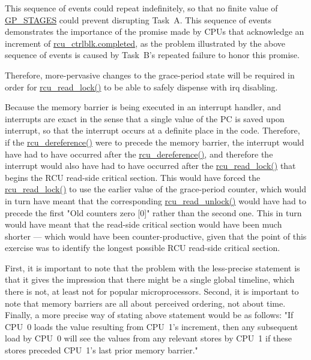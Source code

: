 This sequence of events could repeat indefinitely, so that no finite
value of \url{GP_STAGES} could prevent disrupting Task~A.
This sequence of events demonstrates the importance of the promise
made by CPUs that acknowledge an increment of
\url{rcu_ctrlblk.completed}, as the problem illustrated by the
above sequence of events is caused by Task~B's repeated failure
to honor this promise.

Therefore, more-pervasive changes to the grace-period state will be
required in order for \url{rcu_read_lock()} to be able to safely
dispense with irq disabling.


	Because the memory barrier is being executed in
	an interrupt handler, and interrupts are exact in the sense that
	a single value of the PC is saved upon interrupt, so that the
	interrupt occurs at a definite place in the code.
	Therefore, if the
	\url{rcu_dereference()} were to precede the memory barrier,
	the interrupt would have had to have occurred after the
	\url{rcu_dereference()}, and therefore
	the interrupt would also have had to have occurred after the
	\url{rcu_read_lock()} that begins the RCU read-side critical
	section.
	This would have forced the \url{rcu_read_lock()} to use
	the earlier value of the grace-period counter, which would in turn
	have meant that the corresponding \url{rcu_read_unlock()}
	would have had to precede the first "Old counters zero [0]" rather
	than the second one.
	This in turn would have meant that the read-side critical section
	would have been much shorter --- which would have been
	counter-productive,
	given that the point of this exercise was to identify the longest
	possible RCU read-side critical section.


	First, it is important to note that the problem with
	the less-precise statement is that it gives the impression that there
	might be a single global timeline, which there is not, at least not for
	popular microprocessors.
	Second, it is important to note that memory barriers are all about
	perceived ordering, not about time.
	Finally, a more precise way of stating above statement would be as
	follows: "If CPU~0 loads the value resulting from CPU~1's
	increment, then any subsequent load by CPU~0 will see the
	values from any relevant stores by CPU~1 if these stores
	preceded CPU~1's last prior memory barrier."

